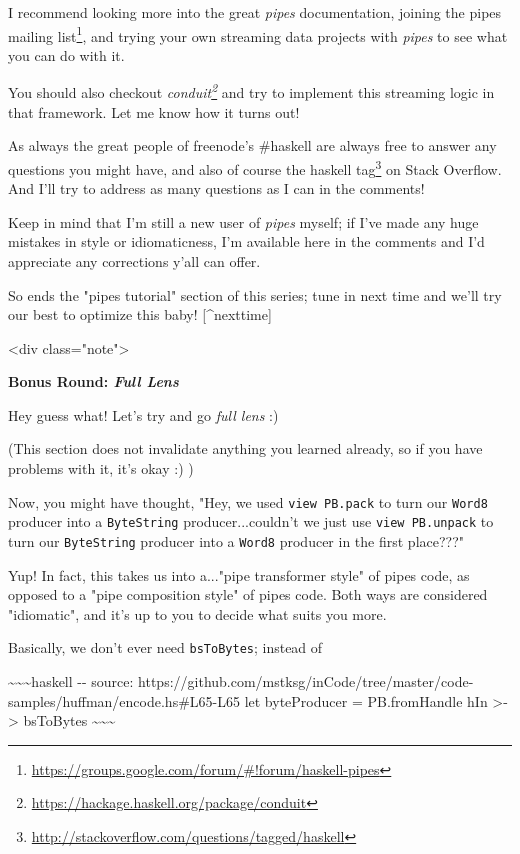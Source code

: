 \documentclass[]{article}
\renewcommand{\href}[2]{#2\footnote{\url{#1}}}
\begin{document}
I recommend looking more into the great \emph{pipes} documentation, joining the
\href{https://groups.google.com/forum/\#!forum/haskell-pipes}{pipes mailing
list}, and trying your own streaming data projects with \emph{pipes} to see what
you can do with it.

You should also checkout
\emph{\href{https://hackage.haskell.org/package/conduit}{conduit}} and try to
implement this streaming logic in that framework. Let me know how it turns out!

As always the great people of freenode's \#haskell are always free to answer any
questions you might have, and also of course the
\href{http://stackoverflow.com/questions/tagged/haskell}{haskell tag} on Stack
Overflow. And I'll try to address as many questions as I can in the comments!

Keep in mind that I'm still a new user of \emph{pipes} myself; if I've made any
huge mistakes in style or idiomaticness, I'm available here in the comments and
I'd appreciate any corrections y'all can offer.

So ends the "pipes tutorial" section of this series; tune in next time and we'll
try our best to optimize this baby! {[}\^{}nexttime{]}

\textless{}div class="note"\textgreater{}

\textbf{Bonus Round: \emph{Full Lens}}

Hey guess what! Let's try and go \emph{full lens} :)

(This section does not invalidate anything you learned already, so if you have
problems with it, it's okay :) )

Now, you might have thought, "Hey, we used \texttt{view\ PB.pack} to turn our
\texttt{Word8} producer into a \texttt{ByteString} producer...couldn't we just
use \texttt{view\ PB.unpack} to turn our \texttt{ByteString} producer into a
\texttt{Word8} producer in the first place???"

Yup! In fact, this takes us into a..."pipe transformer style" of pipes code, as
opposed to a "pipe composition style" of pipes code. Both ways are considered
"idiomatic", and it's up to you to decide what suits you more.

Basically, we don't ever need \texttt{bsToBytes}; instead of

\textasciitilde{}\textasciitilde{}\textasciitilde{}haskell -\/- source:
https://github.com/mstksg/inCode/tree/master/code-samples/huffman/encode.hs\#L65-L65
let byteProducer = PB.fromHandle hIn \textgreater{}-\textgreater{} bsToBytes
\textasciitilde{}\textasciitilde{}\textasciitilde{}
\end{document}
